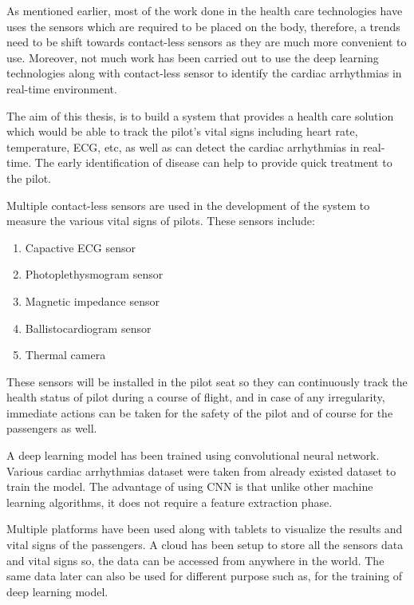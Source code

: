As mentioned earlier, most of the work done in the health care technologies have uses the sensors which are required to be placed on the body, therefore, a trends need to be shift towards contact-less sensors as they are much more convenient to use. Moreover, not much work has been carried out to use the deep learning technologies along with contact-less sensor to identify the cardiac arrhythmias in real-time environment. 

The aim of this thesis, is to build a system that provides a health care solution which would be able to track the pilot's vital signs including heart rate, temperature, ECG, etc, as well as can detect the cardiac arrhythmias in real-time. The early identification of disease can help to provide quick treatment to the pilot.

Multiple contact-less sensors are used in the development of the system to measure the various vital signs of pilots. These sensors include:

\begin{enumerate}
	\item Capactive ECG sensor
	\item Photoplethysmogram sensor
	\item Magnetic impedance sensor
	\item Ballistocardiogram sensor
	\item Thermal camera
\end{enumerate}

These sensors will be installed in the pilot seat so they can continuously track the health status of pilot during a course of flight, and in case of any irregularity, immediate actions can be taken for the safety of the pilot and of course for the passengers as well.

A deep learning model has been trained using convolutional neural network.  Various cardiac arrhythmias dataset were taken from already existed dataset to train the model. The advantage of using CNN is that unlike other machine learning algorithms, it does not require a feature extraction phase.

Multiple platforms have been used along with tablets to visualize the results and vital signs of the passengers. A cloud has been setup to store all the sensors data and vital signs so, the data can be accessed from anywhere in the world.
The same data later can also be used for different purpose such as, for the training of deep learning model.


